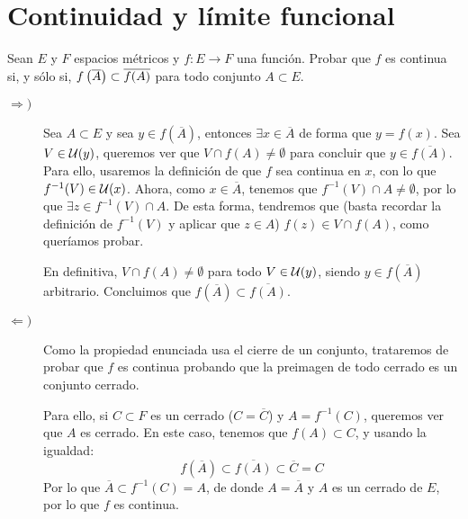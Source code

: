 \section{Continuidad y límite funcional}

\begin{ejercicio}
    Sean $E$ y $F$ espacios métricos y $f:E\to F$ una función. Probar que $f$ es continua si, y sólo si, $f\left(\overline{A}\right)\subset \overline{f(A)}$ para todo conjunto $A \subset E$.\\

    \begin{description}
        \item [$\Longrightarrow)$] Sea $A\subset E$ y sea $y\in f\left(\overline{A}\right)$, entonces $\exists x\in \overline{A}$ de forma que $y = f(x)$. Sea $V \in \mathcal{U}(y)$, queremos ver que $V\cap f(A)\neq \emptyset $ para concluir que $y\in \overline{f(A)}$. Para ello, usaremos la definición de que $f$ sea continua en $x$, con lo que $f^{-1}(V)\in \mathcal{U}(x)$. Ahora, como $x\in \overline{A}$, tenemos que $f^{-1}(V)\cap A \neq \emptyset $, por lo que $\exists z\in f^{-1}(V)\cap A$. De esta forma, tendremos que (basta recordar la definición de $f^{-1}(V)$ y aplicar que $z\in A$) $f(z) \in V\cap f(A)$, como queríamos probar.

            En definitiva, $V\cap f(A) \neq \emptyset $ para todo $V\in \mathcal{U}(y)$, siendo $y\in f\left(\overline{A}\right)$ arbitrario. Concluimos que $f\left(\overline{A}\right) \subset \overline{f(A)}$.
        \item [$\Longleftarrow)$] Como la propiedad enunciada usa el cierre de un conjunto, trataremos de probar que $f$ es continua probando que la preimagen de todo cerrado es un conjunto cerrado.

            Para ello, si $C\subset F$ es un cerrado ($C=\overline{C}$) y $A = f^{-1}(C)$, queremos ver que $A$ es cerrado. En este caso, tenemos que $f(A)\subset C$, y usando la igualdad:
            \begin{equation*}
                f\left(\overline{A}\right) \subset \overline{f(A)} \subset \overline{C} = C
            \end{equation*}
            Por lo que $\overline{A}\subset f^{-1}(C) = A$, de donde $A = \overline{A}$ y $A$ es un cerrado de $E$, por lo que $f$ es continua.
    \end{description}
\end{ejercicio}

